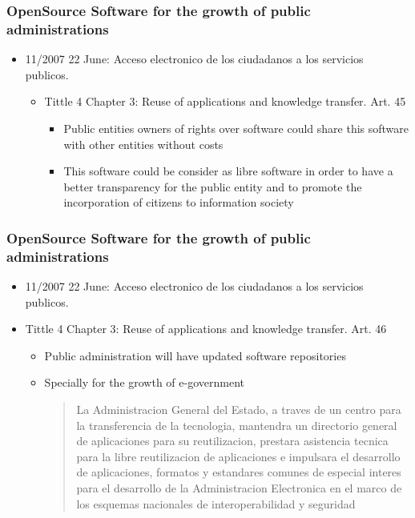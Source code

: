 \documentclass{beamer}
\begin{document}
\begin{frame}
\frametitle{ OpenSource Software for the growth of public administrations}

\begin{itemize}
\item 11/2007 22 June: Acceso electronico de los ciudadanos a los servicios publicos. 

\begin{itemize}
	\item Tittle 4 Chapter 3: Reuse of applications and knowledge transfer. Art. 45
	\begin{itemize}
		\item Public entities owners of rights over software could share this software with other entities without costs
		\item This software could be consider as libre software in order to have a better transparency for the public entity and to promote the incorporation of citizens to information society
	\end{itemize}

\end{itemize}


\end{itemize}

\end{frame}

\begin{frame}
\frametitle{ OpenSource Software for the growth of public administrations}

\begin{itemize}
\item 11/2007 22 June: Acceso electronico de los ciudadanos a los servicios publicos. 

	\item Tittle 4 Chapter 3: Reuse of applications and knowledge transfer. Art. 46	
	\begin{itemize}
		\item Public administration will have updated software repositories 
		\item Specially for the growth of e-government 
		\begin{quote}
La Administracion General del Estado, a traves de un centro
para la transferencia de la tecnologia, mantendra un directorio
general de aplicaciones para su reutilizacion, prestara asistencia
tecnica para la libre reutilizacion de aplicaciones e impulsara el
desarrollo de aplicaciones, formatos y estandares comunes de
especial interes para el desarrollo de la Administracion
Electronica en el marco de los esquemas nacionales de
interoperabilidad y seguridad

		\end{quote}
	\end{itemize}


\end{itemize}

\end{frame}
\end{document}
